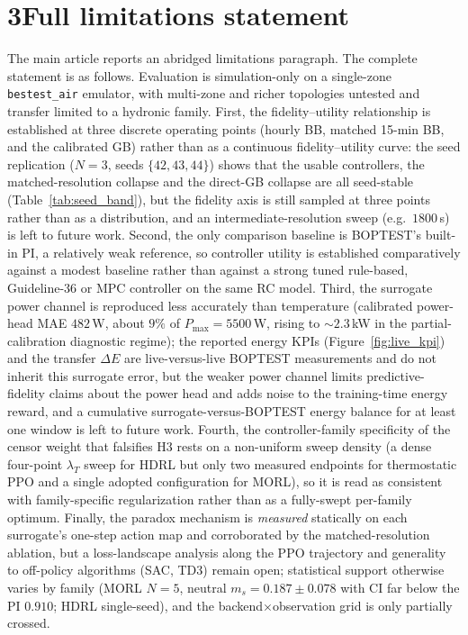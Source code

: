 \documentclass[11pt,a4paper]{article}
\begin{document}
\section*{3\quad Full limitations statement}
The main article reports an abridged limitations paragraph. The complete statement is as follows.
Evaluation is simulation-only on a single-zone \texttt{bestest\_air} emulator, with multi-zone and
richer topologies untested and transfer limited to a hydronic family. First, the fidelity--utility
relationship is established at three discrete operating points (hourly BB, matched 15-min BB, and
the calibrated GB) rather than as a continuous fidelity--utility curve: the seed replication
($N=3$, seeds $\{42,43,44\}$) shows that the usable controllers, the matched-resolution collapse
and the direct-GB collapse are all seed-stable (Table~\ref{tab:seed_band}), but the fidelity axis
is still sampled at three points rather than as a distribution, and an intermediate-resolution
sweep (e.g.\ $1800$\,s) is left to future work. Second, the only comparison baseline is BOPTEST's
built-in PI, a relatively weak reference, so controller utility is established comparatively
against a modest baseline rather than against a strong tuned rule-based, Guideline-36 or MPC
controller on the same RC model. Third, the surrogate power channel is reproduced less accurately
than temperature (calibrated power-head MAE $482$\,W, about $9\%$ of $P_{\max}=5500$\,W, rising to
${\sim}2.3$\,kW in the partial-calibration diagnostic regime); the reported energy KPIs
(Figure~\ref{fig:live_kpi}) and the transfer $\Delta E$ are live-versus-live BOPTEST measurements
and do not inherit this surrogate error, but the weaker power channel limits predictive-fidelity
claims about the power head and adds noise to the training-time energy reward, and a cumulative
surrogate-versus-BOPTEST energy balance for at least one window is left to future work. Fourth, the
controller-family specificity of the censor weight that falsifies H3 rests on a non-uniform sweep
density (a dense four-point $\lambda_T$ sweep for HDRL but only two measured endpoints for
thermostatic PPO and a single adopted configuration for MORL), so it is read as consistent with
family-specific regularization rather than as a fully-swept per-family optimum. Finally, the
paradox mechanism is \emph{measured} statically on each surrogate's one-step action map and
corroborated by the matched-resolution ablation, but a loss-landscape analysis along the PPO
trajectory and generality to off-policy algorithms (SAC, TD3) remain open; statistical support
otherwise varies by family (MORL $N=5$, neutral $m_s=0.187\pm0.078$ with CI far below the PI
$0.910$; HDRL single-seed), and the backend$\times$observation grid is only partially crossed.
\end{document}

